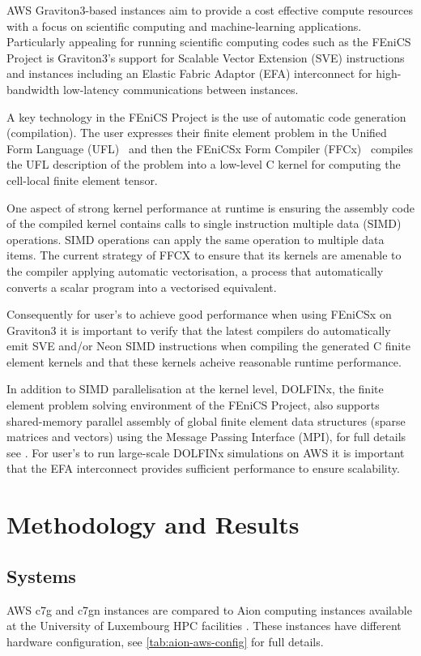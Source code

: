 AWS Graviton3-based instances aim to provide a cost effective compute resources
with a focus on scientific computing and machine-learning applications.
Particularly appealing for running scientific computing codes such as the
FEniCS Project is Graviton3's support for Scalable Vector Extension (SVE)
instructions and instances including an Elastic Fabric Adaptor (EFA)
interconnect for high-bandwidth low-latency communications between instances.

A key technology in the FEniCS Project is the use of automatic code generation
(compilation). The user expresses their finite element problem in the Unified
Form Language (UFL)~\citep{alnaes_unified_2014} and then the FEniCSx Form
Compiler (FFCx)~\citep{kirby_compiler_2006} compiles the UFL description of the
problem into a low-level C kernel for computing the cell-local finite element
tensor.

One aspect of strong kernel performance at runtime is ensuring the assembly
code of the compiled kernel contains calls to single instruction multiple data
(SIMD) operations. SIMD operations can apply the same operation to multiple
data items. The current strategy of FFCX to ensure that its kernels are
amenable to the compiler applying automatic vectorisation, a process that
automatically converts a scalar program into a vectorised equivalent.
 
Consequently for user's to achieve good performance when using FEniCSx on
Graviton3 it is important to verify that the latest compilers do automatically
emit SVE and/or Neon SIMD instructions when compiling the generated C finite
element kernels and that these kernels acheive reasonable runtime performance. 

In addition to SIMD parallelisation at the kernel level, DOLFINx, the finite
element problem solving environment of the FEniCS Project, also supports
shared-memory parallel assembly of global finite element data structures
(sparse matrices and vectors) using the Message Passing Interface (MPI), for
full details see \cite{baratta_dolfinx_2023}. For user's to run large-scale
DOLFINx simulations on AWS it is important that the EFA interconnect provides
sufficient performance to ensure scalability.

\section*{Methodology and Results}

\subsection*{Systems}
AWS c7g and c7gn instances are compared to Aion computing instances available
at the University of Luxembourg HPC facilities \citep{VCPKVO_HPCCT22}. These
instances have different hardware configuration, see
\autoref{tab:aion-aws-config} for full details.

